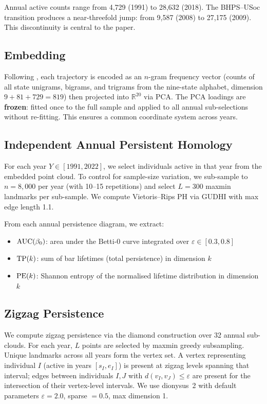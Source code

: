 Annual active counts range from 4,729 (1991) to 28,632 (2018).
The BHPS--USoc transition produces a near-threefold jump: from 9,587 (2008) to
27,175 (2009).
This discontinuity is central to the paper.

\subsection{Embedding}

Following \citet{dorman2026a}, each trajectory is encoded as an $n$-gram
frequency vector (counts of all state unigrams, bigrams, and trigrams from the
nine-state alphabet, dimension $9 + 81 + 729 = 819$) then projected into
$\mathbb{R}^{20}$ via PCA.
The PCA loadings are \textbf{frozen}: fitted once to the full sample and applied
to all annual sub-selections without re-fitting.
This ensures a common coordinate system across years.

\subsection{Independent Annual Persistent Homology}

For each year $Y \in [1991, 2022]$, we select individuals active in that year
from the embedded point cloud.
To control for sample-size variation, we sub-sample to $n = 8{,}000$ per year
(with 10--15 repetitions) and select $L = 300$ maxmin landmarks per sub-sample.
We compute Vietoris--Rips PH via GUDHI \citep{maria2014gudhi} with max edge
length 1.1.

From each annual persistence diagram, we extract:
\begin{itemize}
  \item $\mathrm{AUC}(\beta_0)$: area under the Betti-0 curve integrated over
    $\varepsilon \in [0.3, 0.8]$
  \item $\mathrm{TP}(k)$: sum of bar lifetimes (total persistence) in dimension $k$
  \item $\mathrm{PE}(k)$: Shannon entropy of the normalised lifetime distribution in
    dimension $k$
\end{itemize}

\subsection{Zigzag Persistence}

We compute zigzag persistence via the diamond construction over 32 annual
sub-clouds.
For each year, $L$ points are selected by maxmin greedy subsampling.
Unique landmarks across all years form the vertex set.
A vertex representing individual $I$ (active in years $[s_I, e_I]$) is present
at zigzag levels spanning that interval; edges between individuals $I, J$ with
$d(v_I, v_J) \leq \varepsilon$ are present for the intersection of their
vertex-level intervals.
We use dionysus~2 \citep{morozov2010dionysus} with default parameters
$\varepsilon = 2.0$, sparse $= 0.5$, max dimension 1.

